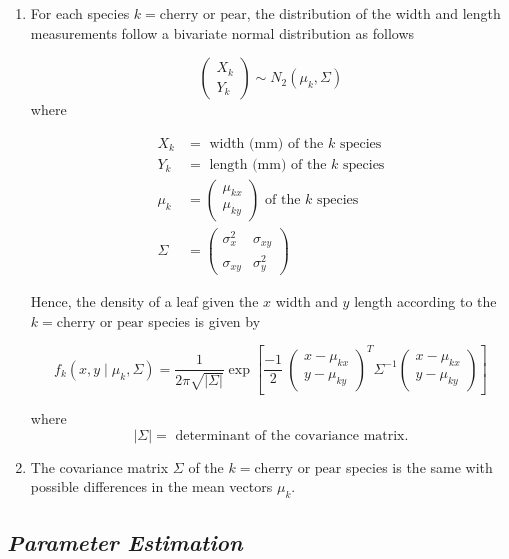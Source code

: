 \documentclass[]{article}
\begin{document}
\begin{enumerate}
\def\labelenumi{\arabic{enumi}.}
\item
  For each species \(k = \text{cherry or pear}\), the distribution of
  the width and length measurements follow a bivariate normal
  distribution as follows

  \[\left(\begin{matrix}X_k \\ Y_k \end{matrix} \right) \sim N_2 \left(\mu_{k}, \Sigma \right)\]
  where

  \begin{align*}
  X_k &= \text{ width (mm) of the $k$ species} \\
  Y_k &= \text{ length (mm) of the $k$ species} \\
  \mu_k &= \left( \begin{matrix}\mu_{kx} \\ \mu_{ky} \end{matrix}\right) \text{ of the $k$ species} \\
  \Sigma &= \left(\begin{matrix} \sigma^2_x &\sigma_{xy} \\ \sigma_{xy} &\sigma^2_{y} \end{matrix} \right)
  \end{align*}

  Hence, the density of a leaf given the \(x\) width and \(y\) length
  according to the \(k = \text{cherry or pear}\) species is given by

  \[f_k(x,y \mid \mu_k, \Sigma) = \frac{1}{2\pi\sqrt{|\Sigma|}} \exp\left[\frac{-1}{2}\ \left(\begin{matrix}x-\mu_{kx} \\ y-\mu_{ky} \end{matrix}\right)^T \Sigma^{-1} \left(\begin{matrix}x-\mu_{kx} \\ y-\mu_{ky} \end{matrix}\right) \right] \]

  where \[|\Sigma| = \text{ determinant of the covariance matrix}.\]
\item
  The covariance matrix \(\Sigma\) of the \(k = \text{cherry or pear}\)
  species is the same with possible differences in the mean vectors
  \(\mu_k.\)
\end{enumerate}

\newpage

\subsection{\normalsize{\textit{Parameter Estimation}}}
\end{document}
